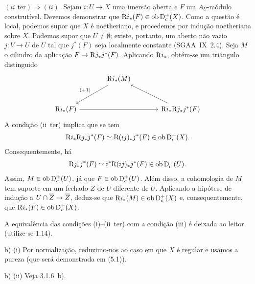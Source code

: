 $(ii\text{~ter}) \Rightarrow (ii)$. Sejam $i : U \to X$ uma imersão aberta e $F$ um $A_U$-módulo construtível. Devemos demonstrar que $\mathrm{R} i_{*}(F) \in \operatorname{ob} \mathrm{D}_c^{+}(X)$. Como a questão é local, podemos supor que $X$ é noetheriano, e procedemos por indução noetheriana sobre $X$. Podemos supor que $U \neq \emptyset$; existe, portanto, um aberto não vazio $j : V \to U$ de $U$ tal que $j^{*}(F)$ seja localmente constante (SGAA~IX~2.4). Seja $M$ o cilindro da aplicação $F \to \mathrm{R} j_{*}j^{*}(F)$. Aplicando $\mathrm{R} i_{*}$, obtém-se um triângulo distinguido
\[
\begin{tikzcd}[column sep=large,row sep=large]
& \R i_{*}(M) \arrow[dl,"{(+1)}"'] & \\
\R i_{*}(F) \arrow[rr] & & \R i_{*}\R j_{*}j^{*}(F) \arrow[ul]
\end{tikzcd}
\]
A condição (ii~ter) implica que se tem
\[
\mathrm{R} i_{*} \mathrm{R} j_{*} j^{*}(F) \simeq \mathrm{R}(ij)_{*} j^{*}(F) \in \operatorname{ob} \mathrm{D}_c^{+}(X).
\]
Consequentemente, há
\[
\mathrm{R} j_{*}j^{*}(F) \simeq i^{*} \mathrm{R}(ij)_{*} j^{*}(F) \in \operatorname{ob} \mathrm{D}_c^{+}(U).
\]
Assim, $M \in \operatorname{ob} \mathrm{D}_c^{+}(U)$, já que $F \in \operatorname{ob} \mathrm{D}_c^{+}(U)$. Além disso, a cohomologia de $M$ tem suporte em um fechado $Z$ de $U$ diferente de $U$. Aplicando a hipótese de indução a $U \cap \overline{Z} \to \overline{Z}$, deduz-se que $\mathrm{R} i_{*}(M) \in \operatorname{ob} \mathrm{D}_c^{+}(X)$ e, consequentemente, que $\mathrm{R} i_{*}(F) \in \operatorname{ob} \mathrm{D}_c^{+}(X)$.

A equivalência das condições (i)--(ii~ter) com a condição (iii) é deixada ao leitor (utilize-se 1.14).

b) (i) Por normalização, reduzimo-nos ao caso em que $X$ é regular e usamos a pureza (que será demonstrada em (5.1)).

b) (ii) Veja 3.1.6~b).
